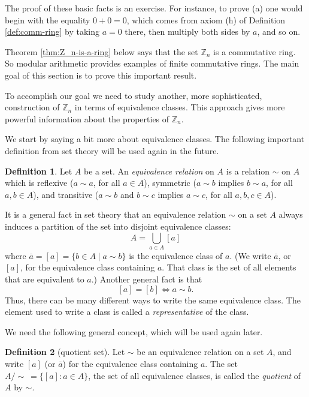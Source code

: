 \documentclass[11pt]{article}
\theoremstyle{definition}
\newtheorem*{defn*}{Definition}
\newcommand{\Z}{\mathbb{Z}} %
\renewcommand{\iff}{\Leftrightarrow}
\begin{document}
The proof of these basic facts is an exercise. For instance, to prove
(a) one would begin with the equality $0 + 0 = 0$, which comes from
axiom (h) of Definition \ref{def:comm-ring} by taking $a=0$ there,
then multiply both sides by $a$, and so on.




Theorem \ref{thm:Z_n-is-a-ring} below says that the set $\Z_n$ is a
commutative ring. So modular arithmetic provides examples of finite
commutative rings. The main goal of this section is to prove this
important result. 

To accomplish our goal we need to study another, more sophisticated,
construction of $\Z_n$ in terms of equivalence classes. This approach
gives more powerful information about the properties of $\Z_n$. 

We start by saying a bit more about equivalence classes.  The
following important definition from set theory will be used again in
the future.

\begin{defn*}
Let $A$ be a set. An \emph{equivalence relation} on $A$ is a relation
$\sim$ on $A$ which is reflexive ($a \sim a$, for all $a \in A$),
symmetric ($a \sim b$ implies $b \sim a$, for all $a,b \in A$), and
transitive ($a \sim b$ and $b \sim c$ implies $a \sim c$, for all
$a,b,c \in A$).
\end{defn*}

It is a general fact in set theory that an equivalence relation $\sim$
on a set $A$ always induces a partition of the set into disjoint
equivalence classes:
\[
  A = \bigcup_{a \in A} [a]
\]
where $\overline{a} = [a] = \{b\in A \mid a \sim b \}$ is the
equivalence class of $a$. (We write $\overline{a}$, or $[a]$, for the
equivalence class containing $a$. That class is the set of all
elements that are equivalent to $a$.)
Another general fact is that
\[
  [a] = [b] \iff a \sim b.
\]
Thus, there can be many different ways to write the same equivalence
class. The element used to write a class is called a
\emph{representative} of the class.


We need the following general concept, which will be used again later.

\begin{defn*}[quotient set]
  Let $\sim$ be an equivalence relation on a set $A$, and write $[a]$
  (or $\overline{a}$) for the equivalence class containing $a$. The
  set $A/\!\!\sim \ = \{ [a] : a \in A \}$, the set of all equivalence
  classes, is called the \emph{quotient} of $A$ by $\sim$.
\end{defn*}
\end{document}
